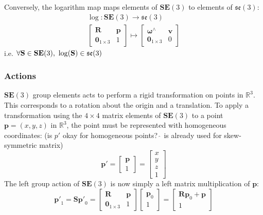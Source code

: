 			Conversely, the logarithm map maps elements of $\mathbf{SE}(3)$ to elements of $\mathfrak{se}(3)$:
			\begin{equation}
				\begin{split}
					\log: \mathbf{SE}(3) \rightarrow \mathfrak{se}(3)\\
					\begin{bmatrix}
						\mathbf{R}	&	\mathbf{p} \\
						\textbf{0}_{1 \times 3}		& 	1 					 				  
					\end{bmatrix}
					\mapsto
					\begin{bmatrix}
					 	\bm{\omega}^{\wedge}	&  \mathbf{v}\\
					 	\textbf{0}_{1 \times 3} & 0			
					\end{bmatrix}
				\end{split}		
			\end{equation}		
			i.e. $\forall \mathbf{S} \in \mathbf{SE}(3)  \textnormal{, } \log(\mathbf{S}) \in  \mathfrak{se}(3)$
		
		\subsubsection{Actions}
		$\mathbf{SE}(3)$ group elements acts to perform a rigid transformation on points in $\mathbb{R}^3$. This corresponds to a rotation about the origin and a translation.
		To apply a transformation using the $4 \times 4$ matrix elements of $\mathbf{SE}(3)$ to a point $\textbf{p} = (x,y,z) $ in $\mathbb{R}^3$, the point must be represented with homogeneous coordinates: (is $p'$ okay for homogeneous points? $\hat{\:}$ is already used for skew-symmetric matrix)
		\begin{equation}
			\mathbf{p'} = 
			\begin{bmatrix}
				  \mathbf{p} \\
				  1	
			\end{bmatrix} =
			\begin{bmatrix}
				  x	\\
				  y	\\
				  z	\\
				  1	
			\end{bmatrix}
		\end{equation}
		The left group action of $\mathbf{SE}(3)$ is now simply a left matrix multiplication of $\mathbf{p}$:
		\begin{equation}
			\mathbf{p'}_1 = \mathbf{S}\mathbf{p'}_0 = 
			\begin{bmatrix}
				\mathbf{R}	&	\mathbf{p} \\
				\textbf{0}_{1 \times 3}		& 	1 					 				  
			\end{bmatrix}
			\begin{bmatrix}
				\mathbf{p}_0 \\
				1	
			\end{bmatrix}
			=
			\begin{bmatrix}
				\mathbf{R}\mathbf{p}_0 + \mathbf{p}\\
				1	
			\end{bmatrix}
		\end{equation}
		
